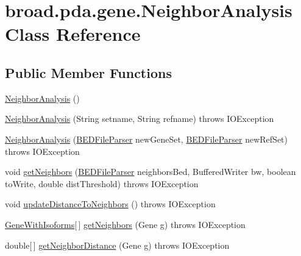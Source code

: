 \hypertarget{classbroad_1_1pda_1_1gene_1_1_neighbor_analysis}{\section{broad.\+pda.\+gene.\+Neighbor\+Analysis Class Reference}
\label{classbroad_1_1pda_1_1gene_1_1_neighbor_analysis}
}
\subsection*{Public Member Functions}
\begin{DoxyCompactItemize}
\item 
\hyperlink{classbroad_1_1pda_1_1gene_1_1_neighbor_analysis_a2b240746e1db83693c2505bae8397bfe}{Neighbor\+Analysis} ()
\item 
\hyperlink{classbroad_1_1pda_1_1gene_1_1_neighbor_analysis_a6327b3934bb67fb7e4914cc6a4ca2855}{Neighbor\+Analysis} (String setname, String refname)  throws I\+O\+Exception
\item 
\hyperlink{classbroad_1_1pda_1_1gene_1_1_neighbor_analysis_a5f32f248d1e5093bfa1fa1118d0b61d2}{Neighbor\+Analysis} (\hyperlink{classbroad_1_1pda_1_1annotation_1_1_b_e_d_file_parser}{B\+E\+D\+File\+Parser} new\+Gene\+Set, \hyperlink{classbroad_1_1pda_1_1annotation_1_1_b_e_d_file_parser}{B\+E\+D\+File\+Parser} new\+Ref\+Set)  throws I\+O\+Exception
\item 
void \hyperlink{classbroad_1_1pda_1_1gene_1_1_neighbor_analysis_a2abf85f1d2a44ca1f234a5aeb88c7c7a}{get\+Neighbors} (\hyperlink{classbroad_1_1pda_1_1annotation_1_1_b_e_d_file_parser}{B\+E\+D\+File\+Parser} neighbors\+Bed, Buffered\+Writer bw, boolean to\+Write, double dist\+Threshold)  throws I\+O\+Exception 
\item 
void \hyperlink{classbroad_1_1pda_1_1gene_1_1_neighbor_analysis_a2f78da6069950c839dfa7628d0bd77bb}{update\+Distance\+To\+Neighbors} ()  throws I\+O\+Exception 
\item 
\hyperlink{classbroad_1_1pda_1_1gene_1_1_gene_with_isoforms}{Gene\+With\+Isoforms}\mbox{[}$\,$\mbox{]} \hyperlink{classbroad_1_1pda_1_1gene_1_1_neighbor_analysis_a8b56a8b65222eacfd043c75f4ef99e00}{get\+Neighbors} (Gene g)  throws I\+O\+Exception
\item 
double\mbox{[}$\,$\mbox{]} \hyperlink{classbroad_1_1pda_1_1gene_1_1_neighbor_analysis_a9121f0c290ec779569131366cf39f2d9}{get\+Neighbor\+Distance} (Gene g)  throws I\+O\+Exception 
\end{DoxyCompactItemize}
